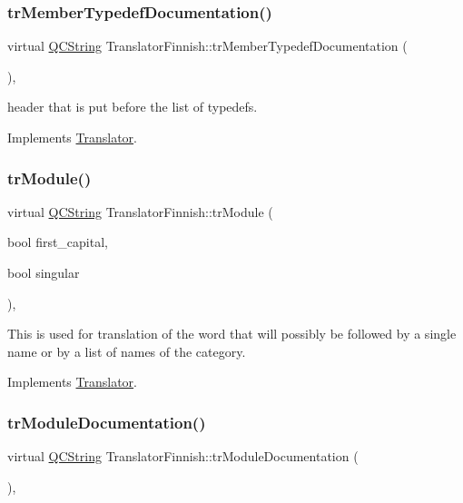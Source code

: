 \subsubsection{\texorpdfstring{trMemberTypedefDocumentation()}{trMemberTypedefDocumentation()}}
{\footnotesize\ttfamily virtual \mbox{\hyperlink{class_q_c_string}{Q\+C\+String}} Translator\+Finnish\+::tr\+Member\+Typedef\+Documentation (\begin{DoxyParamCaption}{ }\end{DoxyParamCaption})\hspace{0.3cm}{\ttfamily [inline]}, {\ttfamily [virtual]}}

header that is put before the list of typedefs. 

Implements \mbox{\hyperlink{class_translator}{Translator}}.

\mbox{\label{class_translator_finnish_a791ef864c70e989c64be70902fb1ed4d}} 
\subsubsection{\texorpdfstring{trModule()}{trModule()}}
{\footnotesize\ttfamily virtual \mbox{\hyperlink{class_q_c_string}{Q\+C\+String}} Translator\+Finnish\+::tr\+Module (\begin{DoxyParamCaption}\item[{bool}]{first\+\_\+capital,  }\item[{bool}]{singular }\end{DoxyParamCaption})\hspace{0.3cm}{\ttfamily [inline]}, {\ttfamily [virtual]}}

This is used for translation of the word that will possibly be followed by a single name or by a list of names of the category. 

Implements \mbox{\hyperlink{class_translator}{Translator}}.

\mbox{\label{class_translator_finnish_a86acf80c5c34b4cef464c9c54f0e9b6b}} 
\subsubsection{\texorpdfstring{trModuleDocumentation()}{trModuleDocumentation()}}
{\footnotesize\ttfamily virtual \mbox{\hyperlink{class_q_c_string}{Q\+C\+String}} Translator\+Finnish\+::tr\+Module\+Documentation (\begin{DoxyParamCaption}{ }\end{DoxyParamCaption})\hspace{0.3cm}{\ttfamily [inline]}, {\ttfamily [virtual]}}

